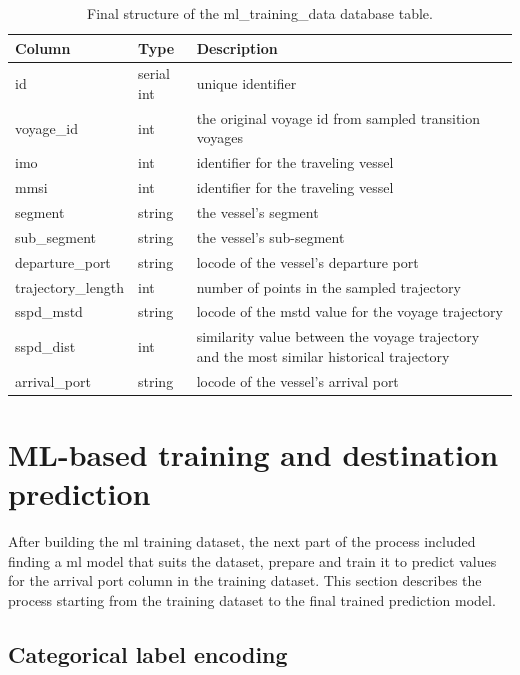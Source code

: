 \begin{table}[htbp]
    \centering
    \small{\begin{tabularx}{1.0\textwidth}{p{1.0in} p{0.75in} X}
        \bfseries{Column} & \bfseries{Type} & \bfseries{Description} \\ \toprule
        id & serial int & unique identifier \\ \midrule
        voyage\_id & int & the original voyage id from sampled transition voyages \\ \midrule
        imo & int & identifier for the traveling vessel\\ \midrule
        mmsi & int & identifier for the traveling vessel\\ \midrule
        segment & string & the vessel's segment \\ \midrule
        sub\_segment & string & the vessel's sub-segment \\ \midrule
        departure\_port & string & \gls{locode} of the vessel's departure port \\ \midrule
        trajectory\_length & int & number of points in the sampled trajectory \\ \midrule
        sspd\_mstd & string & \gls{locode} of the \acrshort{mstd} value for the voyage trajectory \\ \midrule
        sspd\_dist & int & similarity value between the voyage trajectory and the most similar historical trajectory   \\ \midrule
        arrival\_port & string & \gls{locode} of the vessel's arrival port \\ \bottomrule
    \end{tabularx}}
\caption{Final structure of the ml\_training\_data database table.}\label{tab:ml_training_data}
\end{table}

\section{ML-based training and destination prediction}

After building the \acrfull{ml} training dataset, the next part of the process included finding a \acrshort{ml} model that suits the dataset, prepare and train it to predict values for the arrival port column in the training dataset. This section describes the process starting from the training dataset to the final trained prediction model.

\subsection{Categorical label encoding}

